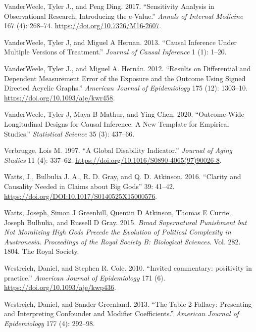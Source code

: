 \documentclass[
  single column]{article}
\newlength{\cslhangindent}
\newenvironment{CSLReferences}[2] %
 {\begin{list}{}{%
  \setlength{\itemindent}{0pt}
  \setlength{\leftmargin}{0pt}
  \setlength{\parsep}{0pt}
  \ifodd #1
   \setlength{\leftmargin}{\cslhangindent}
   \setlength{\itemindent}{-1\cslhangindent}
  \fi
  \setlength{\itemsep}{#2\baselineskip}}}
 {\end{list}}
\begin{document}
\begin{CSLReferences}{1}{0}
VanderWeele, Tyler J., and Peng Ding. 2017. {``Sensitivity Analysis in
Observational Research: Introducing the e-Value.''} \emph{Annals of
Internal Medicine} 167 (4): 268--74.
\url{https://doi.org/10.7326/M16-2607}.

VanderWeele, Tyler J, and Miguel A Hernan. 2013. {``Causal Inference
Under Multiple Versions of Treatment.''} \emph{Journal of Causal
Inference} 1 (1): 1--20.

VanderWeele, Tyler J., and Miguel A. Hernán. 2012. {``Results on
Differential and Dependent Measurement Error of the Exposure and the
Outcome Using Signed Directed Acyclic Graphs.''} \emph{American Journal
of Epidemiology} 175 (12): 1303--10.
\url{https://doi.org/10.1093/aje/kwr458}.

VanderWeele, Tyler J, Maya B Mathur, and Ying Chen. 2020.
{``Outcome-Wide Longitudinal Designs for Causal Inference: A New
Template for Empirical Studies.''} \emph{Statistical Science} 35 (3):
437--66.

Verbrugge, Lois M. 1997. {``A Global Disability Indicator.''}
\emph{Journal of Aging Studies} 11 (4): 337--62.
\url{https://doi.org/10.1016/S0890-4065(97)90026-8}.

Watts, J., Bulbulia J. A., R. D. Gray, and Q. D. Atkinson. 2016.
{``Clarity and Causality Needed in Claims about Big Gods''} 39: 41--42.
\url{https://doi.org/DOI:10.1017/S0140525X15000576}.

Watts, Joseph, Simon J Greenhill, Quentin D Atkinson, Thomas E Currie,
Joseph Bulbulia, and Russell D Gray. 2015. \emph{Broad Supernatural
Punishment but Not Moralizing High Gods Precede the Evolution of
Political Complexity in {A}ustronesia}. \emph{Proceedings of the Royal
Society B: Biological Sciences}. Vol. 282. 1804. The Royal Society.

Westreich, Daniel, and Stephen R. Cole. 2010. {``Invited commentary:
positivity in practice.''} \emph{American Journal of Epidemiology} 171
(6). \url{https://doi.org/10.1093/aje/kwp436}.

Westreich, Daniel, and Sander Greenland. 2013. {``The Table 2 Fallacy:
Presenting and Interpreting Confounder and Modifier Coefficients.''}
\emph{American Journal of Epidemiology} 177 (4): 292--98.


\end{CSLReferences}
\end{document}
